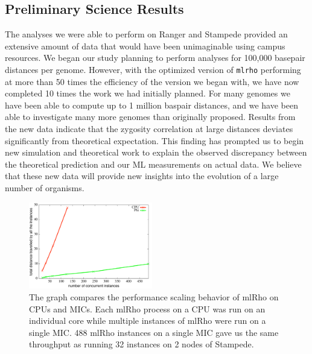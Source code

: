 \documentclass{sig-alternate}
\newcommand{\ty}{\texttt}
\begin{document}
\subsection{Preliminary Science Results}
The analyses we were able to perform on Ranger and Stampede provided an extensive amount of data that would
have been unimaginable using campus resources. We began our study planning to perform analyses for 100,000
basepair distances per genome. However, with the optimized version of \ty{mlrho} performing at more than 50
times the efficiency of the version we began with, we have now completed 10 times the work we had initially
planned. For many genomes we have been able to compute up to 1 million baspair distances, and we have been
able to investigate many more genomes than originally proposed. Results from the new data indicate that the
zygosity correlation at large distances deviates significantly from theoretical expectation. This finding has
prompted us to begin new simulation and theoretical work to explain the observed discrepancy between the
theoretical prediction and our ML measurements on actual data. We believe that these new data will provide new
insights into the evolution of a large number of organisms.

\begin{figure} %
\centering
\includegraphics[width=0.48\textwidth]{figures/mic-scaling.pdf}
\caption{The graph compares the performance scaling behavior of mlRho on CPUs and MICs. Each mlRho process on a CPU was run on an individual core while multiple instances of mlRho were run on a single MIC. 488 mlRho instances on a single MIC gave us the same throughput as running 32 instances on 2 nodes of Stampede.  }
\label{fig:mic-scaling}
\end{figure}
\end{document}
